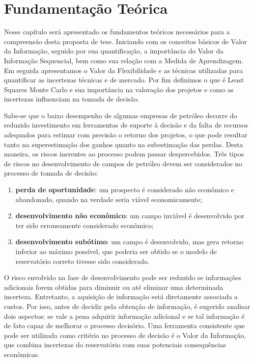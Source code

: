 
\chapter{Fundamentação Teórica}

Nesse capítulo será apresentado os fundamentos teóricos necessários para a compreensão desta proposta de tese. Iniciando com os conceitos básicos de Valor da Informação, seguido por sua quantificação, a importância do Valor da Informação Sequencial, bem como sua relação com a Medida de Aprendizagem. Em seguida apresentamos o Valor da Flexibilidade e as técnicas utilizadas para quantificar as incertezas técnicas e de mercado. Por fim definimos o que é Least Squares Monte Carlo e sua importância na valoração dos projetos e como as incertezas influenciam na tomada de decisão.

Sabe-se que o baixo desempenho de algumas empresas de petróleo decorre do reduzido investimento em ferramentas de suporte à decisão e da falta de recursos adequados para estimar com precisão o retorno dos projetos, o que pode resultar tanto na superestimação dos ganhos quanto na subestimação das perdas. Desta maneira, os riscos inerentes ao processo podem passar despercebidos. Três tipos de riscos no desenvolvimento de campos de petróleo devem ser considerados no processo de tomada de decisão:
\begin{enumerate}
    \item \textbf{perda de oportunidade}: um prospecto é considerado não econômico e abandonado, quando na verdade seria viável economicamente;
    \item \textbf{desenvolvimento não econômico}: um campo inviável é desenvolvido por ter sido erroneamente considerado econômico;
    \item \textbf{desenvolvimento subótimo}: um campo é desenvolvido, mas gera retorno inferior ao máximo possível, que poderia ser obtido se o modelo de reservatório correto tivesse sido considerado.
\end{enumerate}

O risco envolvido na fase de desenvolvimento pode ser reduzido se informações adicionais forem obtidas para diminuir ou até eliminar uma determinada incerteza. Entretanto, a aquisição de informação está diretamente associada a custos. Por isso, antes de decidir pela obtenção de informação,  é sugerido analisar dois aspectos: se vale a pena adquirir informação adicional e se tal informação é de fato capaz de melhorar o processo decisório. Uma ferramenta consistente que pode ser utilizada como critério no processo de decisão é o Valor da Informação, que combina incertezas do reservatório com suas potenciais consequências econômicas. 


